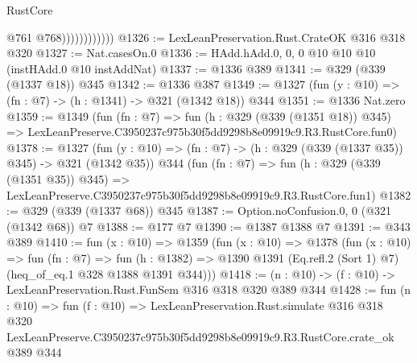 \begin{lexlean}{RustCore}
\begin{coremodule}
                            @761
                            @768))))))))))))
@1326 := LexLeanPreservation.Rust.CrateOK @316 @318 @320
@1327 := Nat.casesOn.{0}
@1336 := HAdd.hAdd.{0, 0, 0} @10 @10 @10 (instHAdd.{0} @10 instAddNat)
@1337 := @1336 @389
@1341 := @329 (@339 (@1337 @18)) @345
@1342 := @1336 @387
@1349 := @1327 (fun (y : @10) => (fn : @7) -> (h : @1341) -> @321 (@1342 @18)) @344
@1351 := @1336 Nat.zero
@1359 := @1349
    (fun (fn : @7) =>
    fun (h : @329 (@339 (@1351 @18)) @345) =>
    LexLeanPreserve.C3950237c975b30f5dd9298b8e09919c9.R3.RustCore.fun0)
@1378 := @1327
    (fun (y : @10) => (fn : @7) -> (h : @329 (@339 (@1337 @35)) @345) -> @321 (@1342 @35))
    @344
    (fun (fn : @7) =>
    fun (h : @329 (@339 (@1351 @35)) @345) =>
    LexLeanPreserve.C3950237c975b30f5dd9298b8e09919c9.R3.RustCore.fun1)
@1382 := @329 (@339 (@1337 @68)) @345
@1387 := Option.noConfusion.{0, 0} (@321 (@1342 @68)) @7
@1388 := @177 @7
@1390 := @1387 @1388 @7
@1391 := @343 @389
@1410 := fun (x : @10) =>
  @1359
    (fun (x : @10) =>
    @1378
      (fun (x : @10) =>
      fun (fn : @7) =>
      fun (h : @1382) =>
      @1390 @1391 (Eq.refl.{2} (Sort 1) @7) (heq_of_eq.{1} @328 @1388 @1391 @344)))
@1418 := (n : @10) -> (f : @10) -> LexLeanPreservation.Rust.FunSem @316 @318 @320 @389 @344
@1428 := fun (n : @10) =>
  fun (f : @10) =>
  LexLeanPreservation.Rust.simulate
    @316
    @318
    @320
    LexLeanPreserve.C3950237c975b30f5dd9298b8e09919c9.R3.RustCore.crate_ok
    @389
    @344
\end{coremodule}
\end{lexlean}
